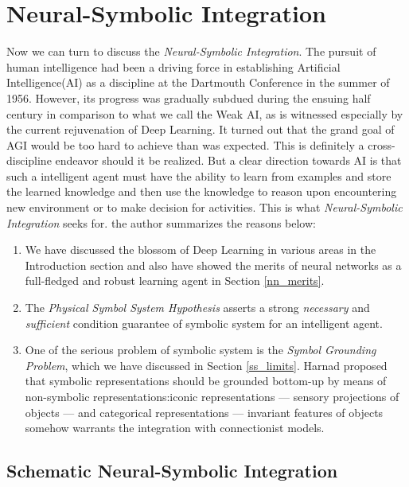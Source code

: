 \documentclass[letterpaper,10pt]{article}
\theoremstyle{definition}
\begin{document}
\section{Neural-Symbolic Integration}\label{nsi_sec}

Now we can turn to discuss the \emph{Neural-Symbolic Integration}. The pursuit of
human intelligence had been a driving force in establishing Artificial Intelligence(AI)
as a discipline at the Dartmouth Conference in the summer of 1956. However, its
progress was gradually subdued during the ensuing half century in comparison to
what we call the Weak AI, as is witnessed especially by the current rejuvenation
of Deep Learning. It turned out that the grand goal of AGI would be too hard to
achieve than was expected. This is definitely a cross-discipline endeavor should 
it be realized. But a clear direction towards AI is that such a intelligent agent
must have the ability to learn from examples and store the learned knowledge and 
then use the knowledge to reason upon encountering new environment or to make
decision for activities. This is what \emph{Neural-Symbolic Integration} seeks for. the author summarizes the reasons below:

\begin{enumerate}[leftmargin=*, noitemsep]
\item We have discussed the blossom of Deep Learning in various areas in the Introduction section and also have showed the merits of neural networks as a full-fledged and robust learning agent in Section \ref{nn_merits}.
\item The \emph{Physical Symbol System Hypothesis} asserts a strong \emph{necessary} and \emph{sufficient} condition guarantee of symbolic system for an intelligent agent.
\item One of the serious problem of symbolic system is the \emph{Symbol Grounding Problem}, which we have discussed in Section \ref{ss_limits}. Harnad proposed\cite{harnad1990symbol} that symbolic representations should be grounded bottom-up by means of non-symbolic representations:iconic representations --- sensory projections of objects --- and categorical representations --- invariant features of objects somehow warrants the integration with connectionist models.
\end{enumerate}

\subsection{Schematic Neural-Symbolic Integration}\label{schematic_sec}
\end{document}
